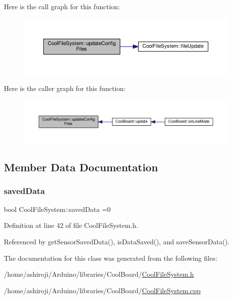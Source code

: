 Here is the call graph for this function\+:\nopagebreak
\begin{figure}[H]
\begin{center}
\leavevmode
\includegraphics[width=350pt]{classCoolFileSystem_adfa8e2e80641ae6f0cceabd348a9b841_cgraph}
\end{center}
\end{figure}
Here is the caller graph for this function\+:\nopagebreak
\begin{figure}[H]
\begin{center}
\leavevmode
\includegraphics[width=350pt]{classCoolFileSystem_adfa8e2e80641ae6f0cceabd348a9b841_icgraph}
\end{center}
\end{figure}


\subsection{Member Data Documentation}
\mbox{\label{classCoolFileSystem_ad398e0c5c41a0c88acdf5d672aa71351}} 
\subsubsection{\texorpdfstring{saved\+Data}{savedData}}
{\footnotesize\ttfamily bool Cool\+File\+System\+::saved\+Data =0\hspace{0.3cm}{\ttfamily [private]}}



Definition at line 42 of file Cool\+File\+System.\+h.



Referenced by get\+Sensor\+Saved\+Data(), is\+Data\+Saved(), and save\+Sensor\+Data().



The documentation for this class was generated from the following files\+:\begin{DoxyCompactItemize}
\item 
/home/ashiroji/\+Arduino/libraries/\+Cool\+Board/\hyperlink{CoolFileSystem_8h}{Cool\+File\+System.\+h}\item 
/home/ashiroji/\+Arduino/libraries/\+Cool\+Board/\hyperlink{CoolFileSystem_8cpp}{Cool\+File\+System.\+cpp}\end{DoxyCompactItemize}
